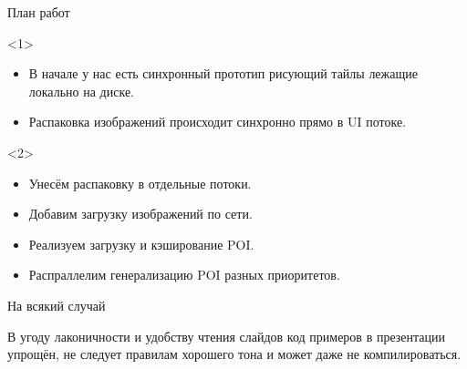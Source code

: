 \documentclass[aspectratio=169,hyperref={unicode},17pt]{beamer}
\begin{document}
\begin{frame}[t]{План работ}
\begin{onlyenv}<1>
\begin{itemize}
 \item В начале у нас есть синхронный прототип рисующий тайлы лежащие локально на диске.
 \item Распаковка изображений происходит синхронно прямо в UI потоке.
\end{itemize}
\end{onlyenv}
\begin{onlyenv}<2>
\begin{itemize}
 \item Унесём распаковку в отдельные потоки.
 \item Добавим загрузку изображений по сети.
 \item Реализуем загрузку и кэширование POI.
 \item Распраллелим генерализацию POI разных приоритетов.
\end{itemize}
\end{onlyenv}
\end{frame}

\begin{frame}[t]{На всякий случай}

В угоду лаконичности и удобству чтения слайдов код примеров в презентации упрощён, не следует правилам хорошего тона и
может даже не компилироваться.
\end{frame}
\end{document}
